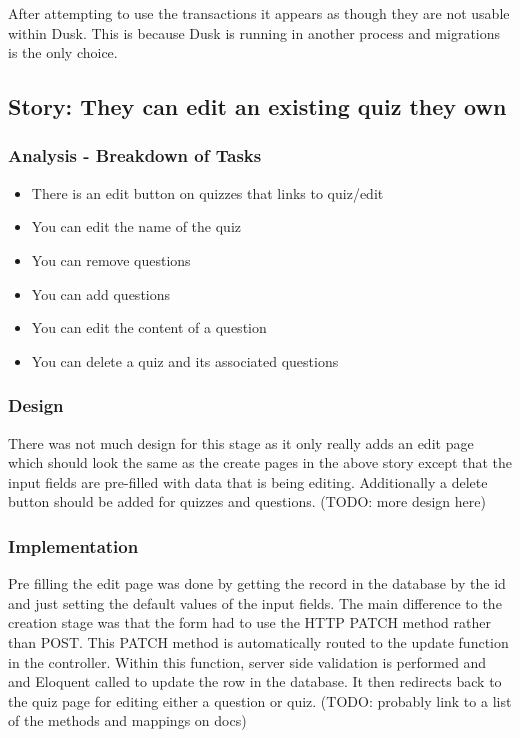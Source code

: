 After attempting to use the transactions it appears as though they are not usable within Dusk. This is because Dusk is running in another process and migrations is the only choice\cite{dusk-transactions}. 
\newpage

\subsection{Story: They can edit an existing quiz they own}
\subsubsection{Analysis - Breakdown of Tasks}
\begin{itemize}
	\item There is an edit button on quizzes that links to quiz/edit
	\item You can edit the name of the quiz
	\item You can remove questions
	\item You can add questions
	\item You can edit the content of a question
	\item You can delete a quiz and its associated questions
\end{itemize}
\subsubsection{Design}
There was not much design for this stage as it only really adds an edit page which should look the same as the create pages in the above story except that the input fields are pre-filled with data that is being editing. Additionally a delete button should be added for quizzes and questions. (TODO: more design here)
\subsubsection{Implementation}
Pre filling the edit page was done by getting the record in the database by the id and just setting the default values of the input fields. The main difference to the creation stage was that the form had to use the HTTP PATCH method rather than POST. This PATCH method is automatically routed to the update function in the controller. Within this function, server side validation is performed and and Eloquent called to update the row in the database. It then redirects back to the quiz page for editing either a question or quiz. (TODO: probably link to a list of the methods and mappings on docs)

